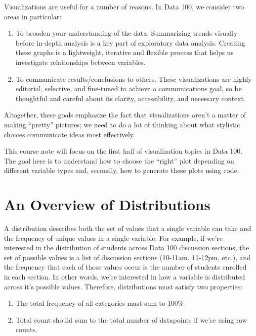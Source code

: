 \documentclass[
  letterpaper,
  DIV=11,
  numbers=noendperiod]{scrreprt}
\providecommand{\tightlist}{%
  \setlength{\itemsep}{0pt}\setlength{\parskip}{0pt}}\usepackage{longtable,booktabs,array}
\begin{document}
Visualizations are useful for a number of reasons. In Data 100, we
consider two areas in particular:

\begin{enumerate}
\def\labelenumi{\arabic{enumi}.}
\tightlist
\item
  To broaden your understanding of the data. Summarizing trends visually
  before in-depth analysis is a key part of exploratory data analysis.
  Creating these graphs is a lightweight, iterative and flexible process
  that helps us investigate relationships between variables.
\item
  To communicate results/conclusions to others. These visualizations are
  highly editorial, selective, and fine-tuned to achieve a
  communications goal, so be thoughtful and careful about its clarity,
  accessibility, and necessary context.
\end{enumerate}

Altogether, these goals emphasize the fact that visualizations aren't a
matter of making ``pretty'' pictures; we need to do a lot of thinking
about what stylistic choices communicate ideas most effectively.

This course note will focus on the first half of visualization topics in
Data 100. The goal here is to understand how to choose the ``right''
plot depending on different variable types and, secondly, how to
generate these plots using code.

\section{An Overview of
Distributions}\label{an-overview-of-distributions}

A distribution describes both the set of values that a single variable
can take and the frequency of unique values in a single variable. For
example, if we're interested in the distribution of students across Data
100 discussion sections, the set of possible values is a list of
discussion sections (10-11am, 11-12pm, etc.), and the frequency that
each of those values occur is the number of students enrolled in each
section. In other words, we're interested in how a variable is
distributed across it's possible values. Therefore, distributions must
satisfy two properties:

\begin{enumerate}
\def\labelenumi{\arabic{enumi}.}
\tightlist
\item
  The total frequency of all categories must sum to 100\%
\item
  Total count should sum to the total number of datapoints if we're
  using raw counts.
\end{enumerate}
\end{document}
